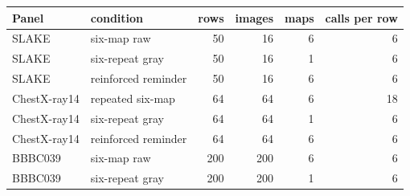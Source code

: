 \begin{tabular}{llrrrr}
\toprule
Panel & condition & rows & images & maps & calls per row \\
\midrule
SLAKE & six-map raw & 50 & 16 & 6 & 6 \\
SLAKE & six-repeat gray & 50 & 16 & 1 & 6 \\
SLAKE & reinforced reminder & 50 & 16 & 6 & 6 \\
ChestX-ray14 & repeated six-map & 64 & 64 & 6 & 18 \\
ChestX-ray14 & six-repeat gray & 64 & 64 & 1 & 6 \\
ChestX-ray14 & reinforced reminder & 64 & 64 & 6 & 6 \\
BBBC039 & six-map raw & 200 & 200 & 6 & 6 \\
BBBC039 & six-repeat gray & 200 & 200 & 1 & 6 \\
\bottomrule
\end{tabular}
